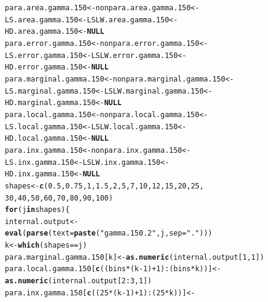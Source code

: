 \documentclass[11pt]{article}\usepackage[]{graphicx}\usepackage[]{color}
\makeatletter
\newcommand{\hlnum}[1]{\textcolor[rgb]{0.686,0.059,0.569}{#1}}%
\newcommand{\hlstr}[1]{\textcolor[rgb]{0.192,0.494,0.8}{#1}}%
\newcommand{\hlopt}[1]{\textcolor[rgb]{0,0,0}{#1}}%
\newcommand{\hlstd}[1]{\textcolor[rgb]{0.345,0.345,0.345}{#1}}%
\newcommand{\hlkwa}[1]{\textcolor[rgb]{0.161,0.373,0.58}{\textbf{#1}}}%
\newcommand{\hlkwb}[1]{\textcolor[rgb]{0.69,0.353,0.396}{#1}}%
\newcommand{\hlkwc}[1]{\textcolor[rgb]{0.333,0.667,0.333}{#1}}%
\newcommand{\hlkwd}[1]{\textcolor[rgb]{0.737,0.353,0.396}{\textbf{#1}}}%
\newenvironment{kframe}{%
 \def\at@end@of@kframe{}%
 \ifinner\ifhmode%
  \def\at@end@of@kframe{\end{minipage}}%
  \begin{minipage}{\columnwidth}%
 \fi\fi%
 \def\FrameCommand##1{\hskip\@totalleftmargin \hskip-\fboxsep
 \colorbox{shadecolor}{##1}\hskip-\fboxsep
     \hskip-\linewidth \hskip-\@totalleftmargin \hskip\columnwidth}%
 \MakeFramed {\advance\hsize-\width
   \@totalleftmargin\z@ \linewidth\hsize
   \@setminipage}}%
 {\par\unskip\endMakeFramed%
 \at@end@of@kframe}
\newenvironment{knitrout}{}{} %
\makeatother
\begin{document}
\begin{knitrout}
\color{fgcolor}\begin{kframe}
\begin{alltt}
\hlstd{para.area.gamma.150} \hlkwb{<-} \hlstd{nonpara.area.gamma.150} \hlkwb{<-}
  \hlstd{LS.area.gamma.150} \hlkwb{<-} \hlstd{LSLW.area.gamma.150} \hlkwb{<-}
  \hlstd{HD.area.gamma.150} \hlkwb{<-} \hlkwa{NULL}
\hlstd{para.error.gamma.150} \hlkwb{<-} \hlstd{nonpara.error.gamma.150} \hlkwb{<-}
  \hlstd{LS.error.gamma.150} \hlkwb{<-} \hlstd{LSLW.error.gamma.150} \hlkwb{<-}
  \hlstd{HD.error.gamma.150} \hlkwb{<-} \hlkwa{NULL}
\hlstd{para.marginal.gamma.150} \hlkwb{<-} \hlstd{nonpara.marginal.gamma.150} \hlkwb{<-}
  \hlstd{LS.marginal.gamma.150} \hlkwb{<-} \hlstd{LSLW.marginal.gamma.150} \hlkwb{<-}
  \hlstd{HD.marginal.gamma.150} \hlkwb{<-} \hlkwa{NULL}
\hlstd{para.local.gamma.150} \hlkwb{<-} \hlstd{nonpara.local.gamma.150} \hlkwb{<-}
  \hlstd{LS.local.gamma.150} \hlkwb{<-} \hlstd{LSLW.local.gamma.150} \hlkwb{<-}
  \hlstd{HD.local.gamma.150} \hlkwb{<-} \hlkwa{NULL}
\hlstd{para.inx.gamma.150} \hlkwb{<-} \hlstd{nonpara.inx.gamma.150} \hlkwb{<-}
  \hlstd{LS.inx.gamma.150} \hlkwb{<-} \hlstd{LSLW.inx.gamma.150} \hlkwb{<-}
  \hlstd{HD.inx.gamma.150} \hlkwb{<-} \hlkwa{NULL}
\hlstd{shapes} \hlkwb{<-} \hlkwd{c}\hlstd{(}\hlnum{0.5}\hlstd{,} \hlnum{0.75}\hlstd{,} \hlnum{1}\hlstd{,} \hlnum{1.5}\hlstd{,} \hlnum{2}\hlstd{,} \hlnum{5}\hlstd{,} \hlnum{7}\hlstd{,} \hlnum{10}\hlstd{,} \hlnum{12}\hlstd{,} \hlnum{15}\hlstd{,} \hlnum{20}\hlstd{,} \hlnum{25}\hlstd{,}
  \hlnum{30}\hlstd{,} \hlnum{40}\hlstd{,} \hlnum{50}\hlstd{,} \hlnum{60}\hlstd{,} \hlnum{70}\hlstd{,} \hlnum{80}\hlstd{,} \hlnum{90}\hlstd{,} \hlnum{100}\hlstd{)}
\hlkwa{for}\hlstd{(j} \hlkwa{in} \hlstd{shapes )\{}
  \hlstd{internal.output} \hlkwb{<-}
    \hlkwd{eval}\hlstd{(}\hlkwd{parse}\hlstd{(}\hlkwc{text}\hlstd{=}\hlkwd{paste}\hlstd{(}\hlstr{"gamma.150.2"}\hlstd{, j,} \hlkwc{sep} \hlstd{=} \hlstr{"."}\hlstd{)))}
  \hlstd{k} \hlkwb{<-} \hlkwd{which}\hlstd{(shapes} \hlopt{==} \hlstd{j)}
  \hlstd{para.marginal.gamma.150[k]} \hlkwb{<-} \hlkwd{as.numeric}\hlstd{(internal.output[}\hlnum{1}\hlstd{,} \hlnum{1}\hlstd{])}
  \hlstd{para.local.gamma.150[}\hlkwd{c}\hlstd{((bins}\hlopt{*}\hlstd{(k}\hlopt{-}\hlnum{1}\hlstd{)}\hlopt{+}\hlnum{1}\hlstd{)}\hlopt{:}\hlstd{(bins}\hlopt{*}\hlstd{k))]} \hlkwb{<-}
    \hlkwd{as.numeric}\hlstd{(internal.output[}\hlnum{2}\hlopt{:}\hlnum{3}\hlstd{,} \hlnum{1}\hlstd{])}
  \hlstd{para.inx.gamma.150[}\hlkwd{c}\hlstd{((}\hlnum{25}\hlopt{*}\hlstd{(k}\hlopt{-}\hlnum{1}\hlstd{)}\hlopt{+}\hlnum{1}\hlstd{)}\hlopt{:}\hlstd{(}\hlnum{25}\hlopt{*}\hlstd{k))]} \hlkwb{<-}

\end{alltt}
\end{kframe}
\end{knitrout}
\end{document}
